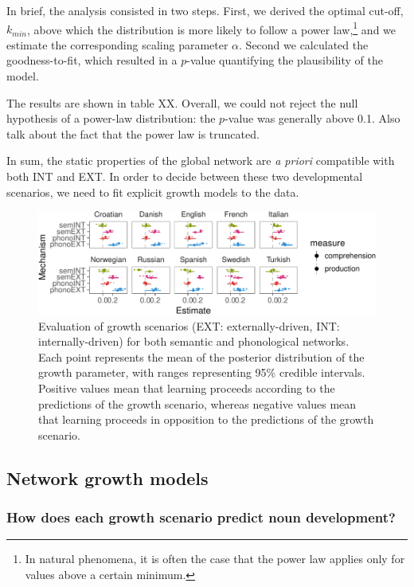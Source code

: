 \documentclass[english,floatsintext,man]{apa6}
\theoremstyle{definition}
\theoremstyle{definition}
\theoremstyle{definition}
\theoremstyle{remark}
\begin{document}
In brief, the analysis consisted in two steps. First, we derived the
optimal cut-off, \(k_{min}\), above which the distribution is more
likely to follow a power
law,\footnote{In natural phenomena, it is often the case that the power law applies only for values above a certain minimum.}
and we estimate the corresponding scaling parameter \(\alpha\). Second
we calculated the goodness-to-fit, which resulted in a \(p\)-value
quantifying the plausibility of the model.

The results are shown in table XX. Overall, we could not reject the null
hypothesis of a power-law distribution: the \(p\)-value was generally
above 0.1. Also talk about the fact that the power law is truncated.

In sum, the static properties of the global network are \emph{a priori}
compatible with both INT and EXT. In order to decide between these two
developmental scenarios, we need to fit explicit growth models to the
data.

\begin{figure}[!h]
\includegraphics[width=\textwidth]{ms_files/figure-latex/growthPred-1} \caption{Evaluation of growth scenarios (EXT: externally-driven, INT: internally-driven) for both semantic and phonological networks. Each point represents the mean of the posterior distribution of the growth parameter, with ranges representing 95\% credible intervals. Positive values mean that learning proceeds according to the predictions of the growth scenario, whereas negative values mean that learning proceeds in opposition to the predictions of the growth scenario.}\label{fig:growthPred}
\end{figure}

\subsection{Network growth models}\label{network-growth-models}

\subsubsection{How does each growth scenario predict noun
development?}\label{how-does-each-growth-scenario-predict-noun-development}
\end{document}
